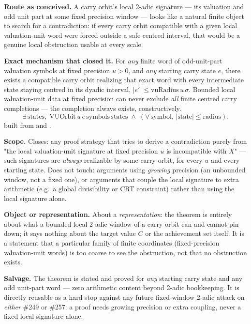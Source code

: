 \begin{prop}
\label{prop:2adic-nogo}
\textbf{Route as conceived.} A carry orbit's local 2-adic signature — its valuation and odd unit
part at some fixed precision window — looks like a natural finite object to search for a
contradiction: if every carry orbit compatible with a given local valuation-unit word were forced
outside a safe centred interval, that would be a genuine local obstruction usable at every scale.

\textbf{Exact mechanism that closed it.} For \emph{any} finite word of odd-unit-part valuation
symbols at fixed precision $u>0$, and \emph{any} starting carry state $e$, there exists a
compatible carry orbit realizing that exact word with every intermediate state staying centred in
its dyadic interval, $|e'|\le \mathrm{vuRadius}\,u\,\sigma$. Bounded local valuation-unit data at
fixed precision can never exclude \emph{all} finite centred carry completions — the completion
always exists, constructively.
\[
  \exists\,\text{states},\; \mathrm{VUOrbit}\,u\,e\,\text{symbols}\,\text{states} \;\land\;
  (\forall\,\text{symbol},\, |\text{state}| \le \text{radius}).
\]
built from
and
.

\textbf{Scope.} Closes: any proof strategy that tries to derive a contradiction purely from "the
local valuation-unit signature at fixed precision $u$ is incompatible with $X$" — such signatures
are \emph{always} realizable by some carry orbit, for every $u$ and every starting state. Does not
touch: arguments using \emph{growing} precision (an unbounded window, not a fixed one), or
arguments that couple the local signature to extra arithmetic (e.g.\ a global divisibility or
CRT constraint) rather than using the local signature alone.

\textbf{Object or representation.} About a \emph{representation}: the theorem is entirely about
what a bounded local 2-adic window of a carry orbit can and cannot pin down; it says nothing about
the target value $C$ or the achievement set itself. It is a statement that a particular family of
finite coordinates (fixed-precision valuation-unit words) is too coarse to see the obstruction, not
that no obstruction exists.

\textbf{Salvage.} The theorem is stated and proved for \emph{any} starting carry state and any odd
unit-part word — zero arithmetic content beyond 2-adic bookkeeping. It is directly reusable as a
hard stop against any future fixed-window 2-adic attack on \emph{either} \#249 or \#257: a proof
needs growing precision or extra coupling, never a fixed local signature alone.
\end{prop}

